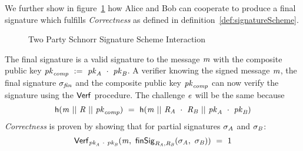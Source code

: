 We further show in figure~\ref{fig:twoparty-schnorr-prot} how Alice and Bob can cooperate to produce a final signature which fulfills \textit{Correctness} as defined in definition~\ref{def:signatureScheme}.

\begin{figure}
    \centering
    \caption{Two Party Schnorr Signature Scheme Interaction}
    \label{fig:twoparty-schnorr-prot}
\end{figure}

The final signature is a valid signature to the message $\mathit{m}$ with the composite public key $\mathit{pk}_{\mathit{comp}} ~:=~ \mathit{pk}_{\mathit{A}} ~\cdot~ \mathit{pk}_{\mathit{B}}$.
A verifier knowing the signed message $\mathit{m}$, the final signature $\sigma_{\mathit{fin}}$ and the composite public key $\mathit{pk}_{\mathit{comp}}$ can now verify the signature using the $\mathsf{Verf}$ procedure.
The challenge $\mathit{e}$ will be the same because
\[ \mathsf{h} (\mathit{m} ~||~ \mathit{R} ~||~ \mathit{pk}_{\mathit{comp}}) ~=~ \mathsf{h} (\mathit{m} ~||~ \mathit{R}_{\mathit{A}} ~\cdot~ \mathit{R}_{\mathit{B}} ~||~ \mathit{pk}_{\mathit{A}} ~\cdot~ \mathit{pk}_{\mathit{B}}) \]
\textit{Correctness} is proven by showing
that for partial signatures $\sigma_{\mathit{A}}$ and $\sigma_{\mathit{B}}$:
\[ \mathsf{Verf}_{\mathit{pk}_{\mathit{A}} ~\cdot~ \mathit{pk}_{\mathit{B}}}(\mathit{m} ,~ \mathsf{finSig}_{\mathit{R}_{\mathit{A}},\mathit{R}_{\mathit{B}}}(\sigma_{\mathit{A}} ,~ \sigma_{\mathit{B}})) ~=~ 1 \]


